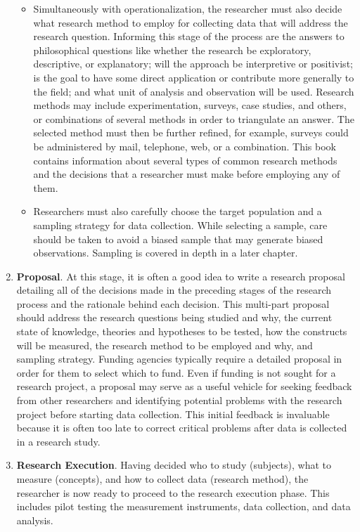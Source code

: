\begin{enumerate}
\begin{itemize}
	\item Simultaneously with operationalization, the researcher must also decide what research method to employ for collecting data that will address the research question. Informing this stage of the process are the answers to philosophical questions like whether the research be exploratory, descriptive, or explanatory; will the approach be interpretive or positivist; is the goal to have some direct application or contribute more generally to the field; and what unit of analysis and observation will be used. Research methods may include experimentation, surveys, case studies, and others, or combinations of several methods in order to triangulate an answer. The selected method must then be further refined, for example, surveys could be administered by mail, telephone, web, or a combination. This book contains information about several types of common research methods and the decisions that a researcher must make before employing any of them.
	
	\item Researchers must also carefully choose the target population and a sampling strategy for data collection. While selecting a sample, care should be taken to avoid a biased sample that may generate biased observations. Sampling is covered in depth in a later chapter.
	
\end{itemize}

\item \textbf{Proposal}. At this stage, it is often a good idea to write a research proposal detailing all of the decisions made in the preceding stages of the research process and the rationale behind each decision. This multi-part proposal should address the research questions being studied and why, the current state of knowledge, theories and hypotheses to be tested, how the constructs will be measured, the research method to be employed and why, and sampling strategy. Funding agencies typically require a detailed proposal in order for them to select which to fund. Even if funding is not sought for a research project, a proposal may serve as a useful vehicle for seeking feedback from other researchers and identifying potential problems with the research project before starting data collection. This initial feedback is invaluable because it is often too late to correct critical problems after data is collected in a research study.

\item \textbf{Research Execution}. Having decided who to study (subjects), what to measure (concepts), and how to collect data (research method), the researcher is now ready to proceed to the research execution phase. This includes pilot testing the measurement instruments, data collection, and data analysis.


\end{enumerate}
